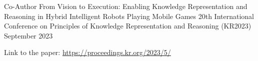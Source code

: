 
\begin{cventries}

\cventry
    {Co-Author} %
    {From Vision to Execution: Enabling Knowledge Representation and Reasoning in Hybrid Intelligent Robots Playing Mobile Games} %
    {20th International Conference on Principles of Knowledge Representation and Reasoning (KR2023)} %
    {September 2023} %
    {
      \begin{cvitems} %
        \item {Link to the paper: \href{https://proceedings.kr.org/2023/5/}{https://proceedings.kr.org/2023/5/}}
      \end{cvitems}
    }


\end{cventries}
